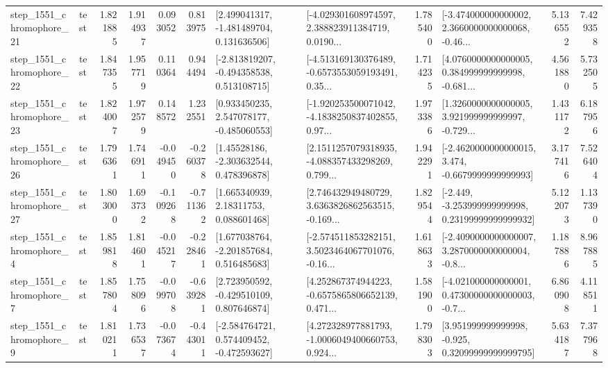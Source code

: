 \begin{tabular}{llrrrrllrlrr}
 step\_1551\_chromophore\_21 &      test &      1.821885 &    1.914937 &      0.093052 &  0.813975 &    [2.499041317, -1.481489704, 0.131636506] &  [-4.029301608974597, 2.388823911384719, 0.0190... &       1.785400 &  [-3.474000000000002, 2.3660000000000068, -0.46... &            5.136552 &          7.429358 \\
 step\_1551\_chromophore\_22 &      test &      1.847355 &    1.957719 &      0.110364 &  0.944494 &   [-2.813819207, -0.494358538, 0.513108715] &  [-4.513169130376489, -0.6573553059193491, 0.35... &       1.714235 &  [4.0760000000000005, 0.384999999999998, -0.681... &            4.561880 &          5.732505 \\
 step\_1551\_chromophore\_23 &      test &      1.824007 &    1.972579 &      0.148572 &  1.232551 &    [0.933450235, 2.547078177, -0.485060553] &  [-1.920253500071042, -4.1838250837402855, 0.97... &       1.973386 &  [1.3260000000000005, 3.921999999999997, -0.729... &            1.431172 &          6.187956 \\
 step\_1551\_chromophore\_26 &      test &      1.796361 &    1.746911 &     -0.049450 & -0.260378 &     [1.45528186, -2.303632544, 0.478396878] &  [2.1511257079318935, -4.088357433298269, 0.799... &       1.942291 &  [-2.4620000000000015, 3.474, -0.6679999999999993] &            3.177416 &          7.526404 \\
 step\_1551\_chromophore\_27 &      test &      1.803000 &    1.693732 &     -0.109268 & -0.711362 &      [1.665340939, 2.18311753, 0.088601468] &  [2.746432949480729, 3.6363826862563515, -0.169... &       1.829544 &  [-2.449, -3.253999999999998, 0.23199999999999932] &            5.122073 &          1.137390 \\
  step\_1551\_chromophore\_4 &      test &      1.859818 &    1.814601 &     -0.045217 & -0.228461 &    [1.677038764, -2.201857684, 0.516485683] &  [-2.574511853282151, 3.5023464067701076, -0.16... &       1.618633 &  [-2.4090000000000007, 3.2870000000000004, -0.8... &            1.187886 &          8.967885 \\
  step\_1551\_chromophore\_7 &      test &      1.857804 &    1.758096 &     -0.099708 & -0.639281 &    [2.723950592, -0.429510109, 0.807646874] &  [4.252867374944223, -0.6575865806652139, 0.471... &       1.581900 &  [-4.021000000000001, 0.47300000000000003, -0.7... &            6.860908 &          4.118511 \\
  step\_1551\_chromophore\_9 &      test &      1.810211 &    1.736537 &     -0.073674 & -0.443011 &   [-2.584764721, 0.574409452, -0.472593627] &  [4.272328977881793, -1.0006049400660753, 0.924... &       1.798303 &   [3.951999999999998, -0.925, 0.32099999999999795] &            5.634187 &          7.377968 \\

\end{tabular}

